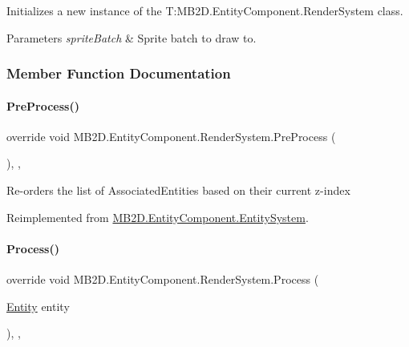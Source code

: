 Initializes a new instance of the T\+:\+M\+B2\+D.\+Entity\+Component.\+Render\+System class. 


\begin{DoxyParams}{Parameters}
{\em sprite\+Batch} & Sprite batch to draw to.\\
\hline
\end{DoxyParams}


\subsubsection{Member Function Documentation}
\hypertarget{class_m_b2_d_1_1_entity_component_1_1_render_system_aadd36efe73a5f8cc489894232a5fc201}{}\label{class_m_b2_d_1_1_entity_component_1_1_render_system_aadd36efe73a5f8cc489894232a5fc201} 
\paragraph{\texorpdfstring{Pre\+Process()}{PreProcess()}}
{\footnotesize\ttfamily override void M\+B2\+D.\+Entity\+Component.\+Render\+System.\+Pre\+Process (\begin{DoxyParamCaption}{ }\end{DoxyParamCaption})\hspace{0.3cm}{\ttfamily [inline]}, {\ttfamily [protected]}, {\ttfamily [virtual]}}



Re-\/orders the list of Associated\+Entities based on their current z-\/index 



Reimplemented from \hyperlink{class_m_b2_d_1_1_entity_component_1_1_entity_system_aadc002dd04d9cb75775ca955a28e303e}{M\+B2\+D.\+Entity\+Component.\+Entity\+System}.

\hypertarget{class_m_b2_d_1_1_entity_component_1_1_render_system_a015ba5b16cc227c7a5a16fcc1ffa73b7}{}\label{class_m_b2_d_1_1_entity_component_1_1_render_system_a015ba5b16cc227c7a5a16fcc1ffa73b7} 
\paragraph{\texorpdfstring{Process()}{Process()}}
{\footnotesize\ttfamily override void M\+B2\+D.\+Entity\+Component.\+Render\+System.\+Process (\begin{DoxyParamCaption}\item[{\hyperlink{class_m_b2_d_1_1_entity_component_1_1_entity}{Entity}}]{entity }\end{DoxyParamCaption})\hspace{0.3cm}{\ttfamily [inline]}, {\ttfamily [protected]}, {\ttfamily [virtual]}}



